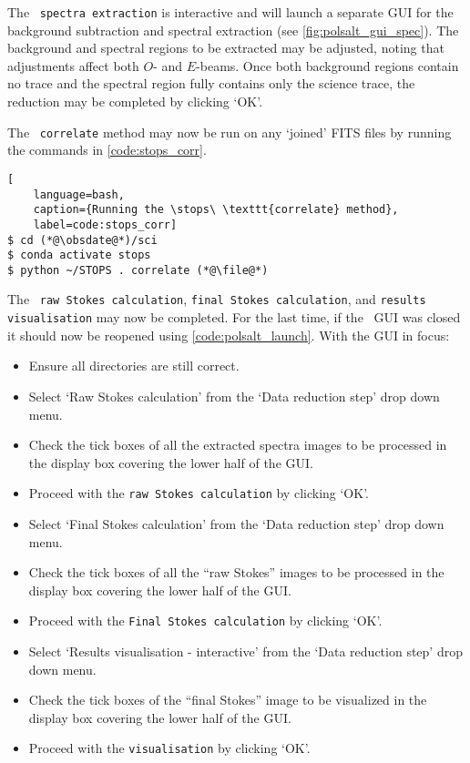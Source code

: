 The \polsalt\ \texttt{spectra extraction} is interactive and will launch a separate \gls{GUI} for the background subtraction and spectral extraction (see \autoref{fig:polsalt_gui_spec}). The background and spectral regions to be extracted may be adjusted, noting that adjustments affect both $O$- and $E$-beams. Once both background regions contain no trace and the spectral region fully contains only the science trace, the reduction may be completed by clicking `OK'.

\pagebreak

The \stops\ \texttt{correlate} method may now be run on any `joined' \gls{FITS} files by running the commands in \autoref{code:stops_corr}.

\begin{lstlisting}[
    language=bash,
    caption={Running the \stops\ \texttt{correlate} method},
    label=code:stops_corr]
$ cd (*@\obsdate@*)/sci
$ conda activate stops
$ python ~/STOPS . correlate (*@\file@*)
\end{lstlisting}

The \polsalt\ \texttt{raw Stokes calculation}, \texttt{final Stokes calculation}, and \texttt{results visualisation} may now be completed. For the last time, if the \polsalt\ \gls{GUI} was closed it should now be reopened using \autoref{code:polsalt_launch}. With the \gls{GUI} in focus:
\begin{itemize}
    \item Ensure all directories are still correct.
    \item Select `Raw Stokes calculation' from the `Data reduction step' drop down menu.
    \item Check the tick boxes of all the extracted spectra images to be processed in the display box covering the lower half of the \gls{GUI}.
    \item Proceed with the \texttt{raw Stokes calculation} by clicking `OK'.
    \item Select `Final Stokes calculation' from the `Data reduction step' drop down menu.
    \item Check the tick boxes of all the ``raw Stokes'' images to be processed in the display box covering the lower half of the \gls{GUI}.
    \item Proceed with the \texttt{Final Stokes calculation} by clicking `OK'.
    \item Select `Results visualisation - interactive' from the `Data reduction step' drop down menu.
    \item Check the tick boxes of the ``final Stokes'' image to be visualized in the display box covering the lower half of the \gls{GUI}.
    \item Proceed with the \texttt{visualisation} by clicking `OK'.
\end{itemize}

